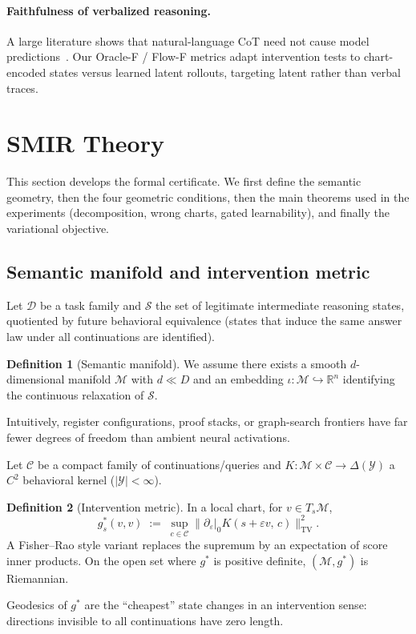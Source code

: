 \documentclass[letterpaper,10pt,twocolumn]{article}
\theoremstyle{definition}
\newtheorem{definition}{Definition}
\newcommand{\TV}{\mathrm{TV}}
\newcommand{\cM}{\mathcal{M}}
\newcommand{\cD}{\mathcal{D}}
\begin{document}
\paragraph{Faithfulness of verbalized reasoning.}
A large literature shows that natural-language CoT need not cause model predictions~\citep{turpin2023faithfulness,lanham2023measuring}.
Our Oracle-F / Flow-F metrics adapt intervention tests to chart-encoded states versus learned latent rollouts, targeting latent rather than verbal traces.

\section{SMIR Theory}
\label{sec:theory}

This section develops the formal certificate.
We first define the semantic geometry, then the four geometric conditions, then the main theorems used in the experiments (decomposition, wrong charts, gated learnability), and finally the variational objective.

\subsection{Semantic manifold and intervention metric}
Let $\cD$ be a task family and $\mathcal{S}$ the set of legitimate intermediate reasoning states, quotiented by future behavioral equivalence (states that induce the same answer law under all continuations are identified).
\begin{definition}[Semantic manifold]
\label{def:manifold}
We assume there exists a smooth $d$-dimensional manifold $\cM$ with $d\ll D$ and an embedding $\iota:\cM\hookrightarrow\mathbb{R}^n$ identifying the continuous relaxation of $\mathcal{S}$.
\end{definition}
Intuitively, register configurations, proof stacks, or graph-search frontiers have far fewer degrees of freedom than ambient neural activations.

Let $\mathcal{C}$ be a compact family of continuations/queries and $K:\cM\times\mathcal{C}\to\Delta(\mathcal{Y})$ a $C^2$ behavioral kernel ($|\mathcal{Y}|<\infty$).
\begin{definition}[Intervention metric]
\label{def:gstar}
In a local chart, for $v\in T_s\cM$,
\begin{equation}
g^*_s(v,v)
\;:=\;
\sup_{c\in\mathcal{C}}
\Big\|
\partial_\varepsilon\big|_{0}
K(s+\varepsilon v,\,c)
\Big\|_{\TV}^2.
\label{eq:gstar}
\end{equation}
A Fisher--Rao style variant replaces the supremum by an expectation of score inner products.
On the open set where $g^*$ is positive definite, $(\cM,g^*)$ is Riemannian.
\end{definition}
Geodesics of $g^*$ are the ``cheapest'' state changes in an intervention sense: directions invisible to all continuations have zero length.
\end{document}

